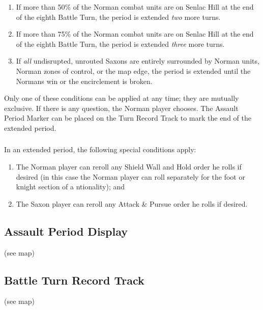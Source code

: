 \begin{enumerate}[label=*]
    \item If more than 50\% of the Norman combat units are on Senlac Hill at the end of the eighth Battle Turn, the period is extended \textit{two} more turns.
    \item If more than 75\% of the Norman combat units are on Senlac Hill at the end of the eighth Battle Turn, the period is extended \textit{three} more turns.
    \item If \textit{all} undisrupted, unrouted Saxons are entirely surrounded by Norman units, Norman zones of control, or the map edge, the period is extended until the Normans win or the encirclement is broken.
\end{enumerate}

Only one of these conditions can be applied at any time; they are mutually exclusive. If there is any question, the Norman player chooses. The Assault Period Marker can be placed on the Turn Record Track to mark the end of the extended period.

\subsubsection{} In an extended period, the following special conditions apply:

\begin{enumerate}[label=*]
    \item The Norman player can reroll any Shield Wall and Hold order he rolls if desired (in this case the Norman player can roll separately for the foot or knight section of a ntionality); and
    \item The Saxon player can reroll any Attack \& Pursue order he rolls if desired.
\end{enumerate}

\subsection{Assault Period Display} (see map)
\subsection{Battle Turn Record Track} (see map)